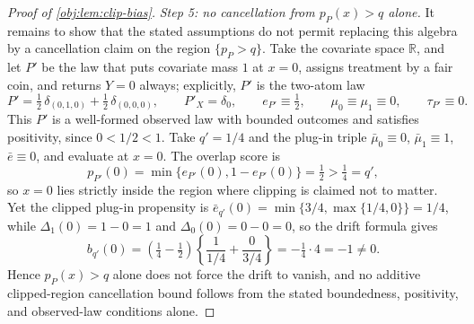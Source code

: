 \begin{proof}[Proof of \cref{obj:lem:clip-bias}]
\emph{Step 5: no cancellation from \(p_P(x)>q\) alone.}  It remains to show that the stated assumptions do not permit replacing this algebra by a cancellation claim on the region \(\{p_P>q\}\).  Take the covariate space \(\mathbb R\), and let \(P'\) be the law that puts covariate mass \(1\) at \(x=0\), assigns treatment by a fair coin, and returns \(Y=0\) always; explicitly, \(P'\) is the two-atom law
\[
P'=\tfrac12\,\delta_{(0,1,0)}+\tfrac12\,\delta_{(0,0,0)},
\qquad
P'_X=\delta_0,
\qquad
e_{P'}\equiv\tfrac12,
\qquad
\mu_0\equiv\mu_1\equiv 0,
\qquad
\tau_{P'}\equiv 0 .
\]
This \(P'\) is a well-formed observed law with bounded outcomes and satisfies positivity, since \(0<1/2<1\). %
Take \(q'=1/4\) and the plug-in triple \(\bar\mu_0\equiv0\), \(\bar\mu_1\equiv1\), \(\bar e\equiv0\), and evaluate at \(x=0\).  The overlap score is
\[
p_{P'}(0)=\min\{e_{P'}(0),1-e_{P'}(0)\}=\tfrac12>\tfrac14=q',
\]
so \(x=0\) lies strictly inside the region where clipping is claimed not to matter. %
Yet the clipped plug-in propensity is \(\bar e_{q'}(0)=\min\{3/4,\max\{1/4,0\}\}=1/4\), while \(\Delta_1(0)=1-0=1\) and \(\Delta_0(0)=0-0=0\), so the drift formula gives
\[
b_{q'}(0)
=
\left(\tfrac14-\tfrac12\right)
\left\{\frac{1}{1/4}+\frac{0}{3/4}\right\}
=
-\tfrac14\cdot 4
=
-1
\ne 0 .
\]
Hence \(p_P(x)>q\) alone does not force the drift to vanish, and no additive clipped-region cancellation bound follows from the stated boundedness, positivity, and observed-law conditions alone. %
\end{proof}
